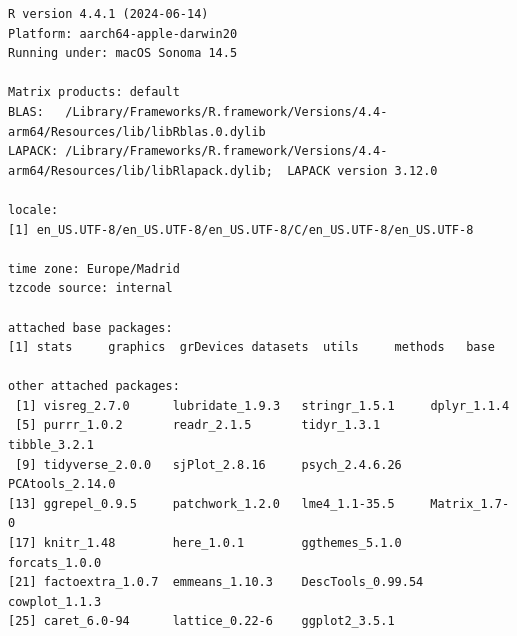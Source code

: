 \documentclass[
  letterpaper,
  DIV=11,
  numbers=noendperiod]{scrreprt}
\begin{document}
\begin{verbatim}
R version 4.4.1 (2024-06-14)
Platform: aarch64-apple-darwin20
Running under: macOS Sonoma 14.5

Matrix products: default
BLAS:   /Library/Frameworks/R.framework/Versions/4.4-arm64/Resources/lib/libRblas.0.dylib 
LAPACK: /Library/Frameworks/R.framework/Versions/4.4-arm64/Resources/lib/libRlapack.dylib;  LAPACK version 3.12.0

locale:
[1] en_US.UTF-8/en_US.UTF-8/en_US.UTF-8/C/en_US.UTF-8/en_US.UTF-8

time zone: Europe/Madrid
tzcode source: internal

attached base packages:
[1] stats     graphics  grDevices datasets  utils     methods   base     

other attached packages:
 [1] visreg_2.7.0      lubridate_1.9.3   stringr_1.5.1     dplyr_1.1.4      
 [5] purrr_1.0.2       readr_2.1.5       tidyr_1.3.1       tibble_3.2.1     
 [9] tidyverse_2.0.0   sjPlot_2.8.16     psych_2.4.6.26    PCAtools_2.14.0  
[13] ggrepel_0.9.5     patchwork_1.2.0   lme4_1.1-35.5     Matrix_1.7-0     
[17] knitr_1.48        here_1.0.1        ggthemes_5.1.0    forcats_1.0.0    
[21] factoextra_1.0.7  emmeans_1.10.3    DescTools_0.99.54 cowplot_1.1.3    
[25] caret_6.0-94      lattice_0.22-6    ggplot2_3.5.1    


\end{verbatim}
\end{document}
